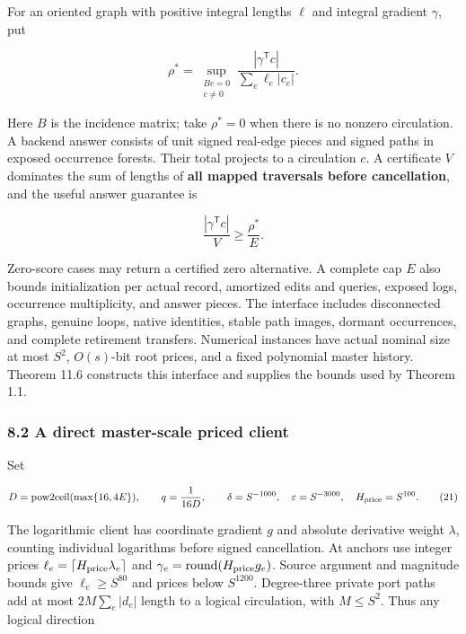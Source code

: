 For an oriented graph with positive integral lengths \(\ell\) and integral gradient \(\gamma\), put

\[
\rho^*=\sup_{\substack{Bc=0\\c\ne0}}
           \frac{|\gamma^{\mathsf T}c|}{\sum_e\ell_e|c_e|}.
 \tag{19}
\]

Here \(B\) is the incidence matrix; take \(\rho^*=0\) when there is no nonzero circulation. A backend answer consists of unit signed real-edge pieces and signed paths in exposed occurrence forests. Their total projects to a circulation \(c\). A certificate \(V\) dominates the sum of lengths of \textbf{all mapped traversals before cancellation}, and the useful answer guarantee is

\[
\frac{|\gamma^{\mathsf T}c|}{V}\geq\frac{\rho^*}{E}.
 \tag{20}
\]

Zero-score cases may return a certified zero alternative. A complete cap \(E\) also bounds initialization per actual record, amortized edits and queries, exposed logs, occurrence multiplicity, and answer pieces. The interface includes disconnected graphs, genuine loops, native identities, stable path images, dormant occurrences, and complete retirement transfers. Numerical instances have actual nominal size at most \(S^2\), \(O(s)\)-bit root prices, and a fixed polynomial master history. Theorem 11.6 constructs this interface and supplies the bounds used by Theorem 1.1.

\hypertarget{af-46593eb93e-a-direct-master-scale-priced-client}{%
\subsubsection{8.2 A direct master-scale priced client}\label{af-46593eb93e-a-direct-master-scale-priced-client}}

Set

\[
D=\mathrm{pow2ceil}(\max\{16,4E\}),\qquad
 q=\frac1{16D},\qquad
 \delta=S^{-1000},\quad \varepsilon=S^{-3000},
 \quad H_{\rm price}=S^{100}.
 \tag{21}
\]

The logarithmic client has coordinate gradient \(g\) and absolute derivative weight \(\lambda\), counting individual logarithms before signed cancellation. At anchors use integer prices \(\ell_e=\lceil H_{\rm price}\lambda_e\rceil\) and \(\gamma_e=\mathrm{round}(H_{\rm price}g_e)\). Source argument and magnitude bounds give \(\ell_e\geq S^{80}\) and prices below \(S^{1200}\). Degree-three private port paths add at most \(2M\sum_e|d_e|\) length to a logical circulation, with \(M\leq S^2\). Thus any logical direction


